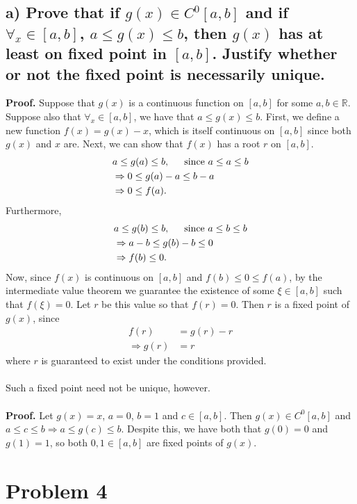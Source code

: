 \documentclass[11pt, letterpaper]{article}
\begin{document}
\subsection*{a) \normalfont Prove that if $g(x)\in C^0[a,b]$ and if $\forall_x\in[a,b]$, $a\leq g(x)\leq b$,
then $g(x)$ has at least on fixed point in $[a,b]$. Justify whether or not the fixed point is necessarily unique.}
{\bf Proof.} Suppose that $g(x)$ is a continuous function on $[a,b]$ for some $a,b\in\mathbb{R}$. Suppose also that 
$\forall_x\in[a,b]$, we have that $a\leq g(x)\leq b$. First, we define a new function $f(x)=g(x)-x$, which is
itself continuous on $[a,b]$ since both $g(x)$ and $x$ are. Next, we can show that $f(x)$ has a root $r$ on $[a,b]$.
\begin{align*}
    &a\leq g(a)\leq b, \text{\indent since $a\leq a\leq b$}\\
    &\Rightarrow 0\leq g(a)-a\leq b-a\\
    &\Rightarrow 0\leq f(a).
\end{align*}
Furthermore,
\begin{align*}
    &a\leq g(b)\leq b, \text{\indent since $a\leq b\leq b$}\\
    &\Rightarrow a-b\leq g(b)-b\leq 0\\
    &\Rightarrow f(b)\leq 0.
\end{align*}
Now, since $f(x)$ is continuous on $[a,b]$ and $f(b)\leq 0\leq f(a)$, by the intermediate value theorem
we guarantee the existence of some $\xi\in[a,b]$ such that $f(\xi)=0$. Let $r$ be this value so that $f(r)=0$.
Then $r$ is a fixed point of $g(x)$, since
\begin{align*}
    f(r)&=g(r)-r\\
    \Rightarrow g(r)&=r
\end{align*}
where $r$ is guaranteed to exist under the conditions provided. \\\\
Such a fixed point need not be unique, however. \\\\
{\bf Proof.} Let $g(x)=x$, $a=0$, $b=1$ and $c\in[a,b]$. Then $g(x)\in C^0[a,b]$ and $a\leq c\leq b\Rightarrow a\leq g(c)\leq b$.
Despite this, we have both that $g(0)=0$ and $g(1)=1$, so both $0,1\in [a,b]$ are fixed points of $g(x)$.
\section*{Problem 4}
\end{document}
